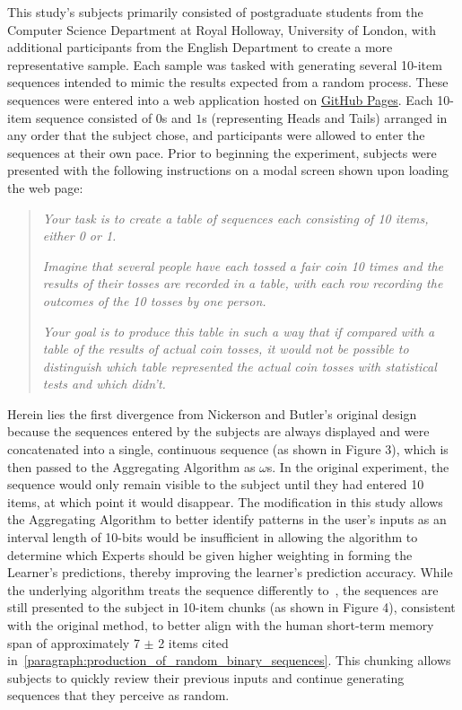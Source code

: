 This study's subjects primarily consisted of postgraduate students from the Computer Science Department at Royal Holloway, University of London, with additional participants from the English Department to create a more representative sample. Each sample was tasked with generating several 10-item sequences intended to mimic the results expected from a random process. These sequences were entered into a web application hosted on \href{https://arbarraclough.github.io/aggregating_algorithm/}{GitHub Pages}. Each 10-item sequence consisted of $0$s and $1$s (representing Heads and Tails) arranged in any order that the subject chose, and participants were allowed to enter the sequences at their own pace. Prior to beginning the experiment, subjects were presented with the following instructions on a modal screen shown upon loading the web page:

\begin{quote}
    \textit{Your task is to create a table of sequences each consisting of 10 items, either 0 or 1.}

    \textit{Imagine that several people have each tossed a fair coin 10 times and the results of their tosses are recorded in a table, with each row recording the outcomes of the 10 tosses by one person.}

    \textit{Your goal is to produce this table in such a way that if compared with a table of the results of actual coin tosses, it would not be possible to distinguish which table represented the actual coin tosses with statistical tests and which didn't.}
\end{quote}

\noindent Herein lies the first divergence from Nickerson and Butler's original design because the sequences entered by the subjects are always displayed and were concatenated into a single, continuous sequence (as shown in Figure 3), which is then passed to the Aggregating Algorithm as $\omega$s. In the original experiment, the sequence would only remain visible to the subject until they had entered 10 items, at which point it would disappear. The modification in this study allows the Aggregating Algorithm to better identify patterns in the user's inputs as an interval length of 10-bits would be insufficient in allowing the algorithm to determine which Experts should be given higher weighting in forming the Learner's predictions, thereby improving the learner's prediction accuracy. While the underlying algorithm treats the sequence differently to~\cite{nickerson:2009}, the sequences are still presented to the subject in 10-item chunks (as shown in Figure 4), consistent with the original method, to better align with the human short-term memory span of approximately 7 $\pm$ 2 items cited in~\ref{paragraph:production_of_random_binary_sequences}. This chunking allows subjects to quickly review their previous inputs and continue generating sequences that they perceive as random.

